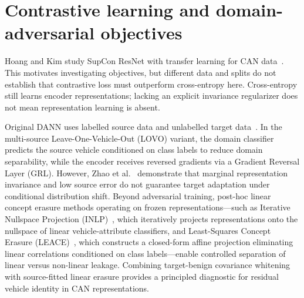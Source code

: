 \documentclass[12pt, a4paper, reqno, oneside]{book}
\begin{document}
\section{Contrastive learning and domain-adversarial objectives}
Hoang and Kim study SupCon ResNet with transfer learning for CAN data~\cite{hoang2022supcon}. This motivates investigating objectives, but different data and splits do not establish that contrastive loss must outperform cross-entropy here. Cross-entropy still learns encoder representations; lacking an explicit invariance regularizer does not mean representation learning is absent.

Original DANN uses labelled source data and unlabelled target data~\cite{ganin2016dann}. In the multi-source Leave-One-Vehicle-Out (LOVO) variant, the domain classifier predicts the source vehicle conditioned on class labels to reduce domain separability, while the encoder receives reversed gradients via a Gradient Reversal Layer (GRL). However, Zhao et al.~\cite{zhao2019invariant} demonstrate that marginal representation invariance and low source error do not guarantee target adaptation under conditional distribution shift. Beyond adversarial training, post-hoc linear concept erasure methods operating on frozen representations---such as Iterative Nullspace Projection (INLP)~\cite{ravfogel2020null}, which iteratively projects representations onto the nullspace of linear vehicle-attribute classifiers, and Least-Squares Concept Erasure (LEACE)~\cite{belrose2023leace}, which constructs a closed-form affine projection eliminating linear correlations conditioned on class labels---enable controlled separation of linear versus non-linear leakage. Combining target-benign covariance whitening with source-fitted linear erasure provides a principled diagnostic for residual vehicle identity in CAN representations.
\end{document}
